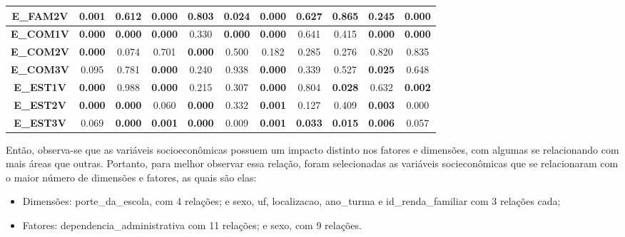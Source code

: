 \begin{table}[ht!]
{\begin{tabular}{|c|c|c|c|c|c|c|c|c|c|c|}
        \textbf{E\_FAM2V}  & \textbf{0.001} & 0.612 & \textbf{0.000} & 0.803 & \textbf{0.024} & \textbf{0.000} & 0.627 & 0.865 & 0.245 & \textbf{0.000} \\ \hline
        \textbf{E\_COM1V}  & \textbf{0.000} & \textbf{0.000} & \textbf{0.000} & 0.330 & \textbf{0.000} & \textbf{0.000} & 0.641 & 0.415 & \textbf{0.000} & \textbf{0.000} \\ \hline
        \textbf{E\_COM2V}  & \textbf{0.000} & 0.074 & 0.701 & \textbf{0.000} & 0.500 & 0.182 & 0.285 & 0.276 & 0.820 & 0.835 \\ \hline
        \textbf{E\_COM3V}  & 0.095 & 0.781 & \textbf{0.000} & 0.240 & 0.938 & \textbf{0.000} & 0.339 & 0.527 & \textbf{0.025} & 0.648 \\ \hline
        \textbf{E\_EST1V}  & \textbf{0.000} & 0.988 & \textbf{0.000} & 0.215 & 0.307 & \textbf{0.000} & 0.804 & \textbf{0.028} & 0.632 & \textbf{0.002} \\ \hline
        \textbf{E\_EST2V}  &\textbf{ 0.000} &\textbf{ 0.000} & 0.060 & \textbf{0.000} & 0.332 & \textbf{0.001} & 0.127 & 0.409 & \textbf{0.003} & 0.000 \\ \hline
        \textbf{E\_EST3V}  & 0.069 & \textbf{0.000} & \textbf{0.001} & \textbf{0.000} & 0.009 & \textbf{0.001} & \textbf{0.033} & \textbf{0.015} &\textbf{ 0.006} & 0.057 \\ \hline
    \end{tabular}%
    }
    \label{tab:pvalor_fatores}
\end{table}

Então, observa-se que as variáveis socioeconômicas possuem um impacto distinto nos fatores e dimensões, com algumas se relacionando com mais áreas que outras. Portanto, para melhor observar essa relação, foram selecionadas as variáveis socieconômicas que se relacionaram com o maior número de dimensões e fatores, as quais são elas:

\begin{itemize}
    \item Dimensões: porte\_da\_escola, com 4 relações; e sexo, uf, localizacao, ano\_turma e id\_renda\_familiar com 3 relações cada;
    \item Fatores: dependencia\_administrativa com 11 relações; e sexo, com 9 relações.
\end{itemize}


